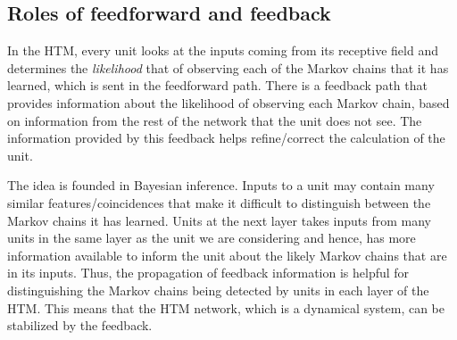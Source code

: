 \subsection{Roles of feedforward and feedback}

In the HTM, every unit looks at the inputs coming from its receptive field and determines the \emph{likelihood} that of observing each of the Markov chains that it has learned, which is sent in the feedforward path. There is a feedback path that provides information about the likelihood of observing each Markov chain, based on information from the rest of the network that the unit does not see. The information provided by this feedback helps refine/correct the calculation of the unit.

The idea is founded in Bayesian inference. Inputs to a unit may contain many similar features/coincidences that make it difficult to distinguish between the Markov chains it has learned. Units at the next layer takes inputs from many units in the same layer as the unit we are considering and hence, has more information available to inform the unit about the likely Markov chains that are in its inputs. Thus, the propagation of feedback information is helpful for distinguishing the Markov chains being detected by units in each layer of the HTM. This means that the HTM network, which is a dynamical system, can be stabilized by the feedback.